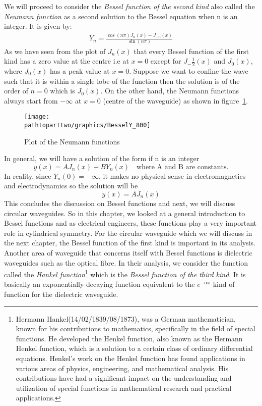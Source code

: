 We will proceed to consider the \emph{Bessel function of the second kind} also called the \emph{Neumann function} as a second solution to the Bessel equation when n is an integer. It is given by: 
\begin{align}
Y_n = \frac{\cos(n\pi) J_n(x) - J_{-n}(x)}{\sin(n\pi)}
\label{eqn:neumannfunctions}
\end{align}
As we have seen from the plot of $J_n(x)$ that every Bessel function of the first kind has a zero value at the centre i.e at $x= 0$ except for $J_-{\frac{1}{2}}(x)$ and $J_0(x)$, where $J_0(x)$ has a peak value at $ x= 0$. Suppose we want to confine the wave such that it is within a single lobe of the function then the solution is of the order of $n =0$ which is $J_0(x)$. On the other hand, the Neumann functions always start from $-\infty$ at $x=0$ (centre of the waveguide) as shown in figure~\ref{fig:fig-3}.
\begin{figure}[h]
\centering
\texttt{[image: \\pathtoparttwo/graphics/BesselY\_800]}
\caption{ Plot of the Neumann functions}
\label{fig:fig-3}
\end{figure}

In general, we will have a solution of the form if n is an integer
\begin{equation*}
y(x) = AJ_n(x) + B Y_n(x)\quad\text{where A and B are constants.}
\end{equation*}
In reality, since $Y_n(0) = -\infty$, it makes no physical sense in electromagnetics and electrodynamics so the solution will be 
\begin{equation}
y(x) = AJ_n(x)
\end{equation}
This concludes the discussion on Bessel functions and next, we will discuss circular waveguides. So in this chapter, we looked at a general introduction to Bessel functions and as electrical engineers, these functions play a very important role in cylindrical symmetry. For the circular waveguide which we will discuss in the next chapter, the Bessel function of the first kind is important in its analysis. Another area of waveguide that concerns itself with Bessel functions is dielectric waveguides such as the optical fibre. In their analysis, we consider the function called the \emph{Hankel function}\footnote{
Hermann Hankel(14/02/1839/08/1873), was a German mathematician, known for his contributions to mathematics, specifically in the field of special functions. He developed the Henkel function, also known as the Hermann Henkel function, which is a solution to a certain class of ordinary differential equations. Henkel's work on the Henkel function has found applications in various areas of physics, engineering, and mathematical analysis. His contributions have had a significant impact on the understanding and utilization of special functions in mathematical research and practical applications.
} which is the \emph{Bessel function of the third kind}. It is basically an exponentially decaying function equivalent to the $e^{-\alpha x}$ kind of function for the dielectric waveguide.
